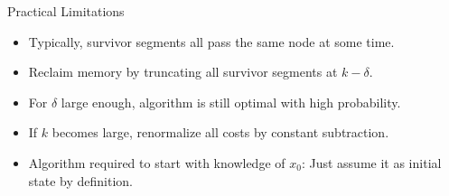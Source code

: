 \documentclass[xetex,mathserif,serif]{beamer}
\begin{document}
\begin{frame}{Practical Limitations}
    \begin{itemize}
        \item Typically, survivor segments all pass the same node at some time.
        \item Reclaim memory by truncating all survivor segments at
              $k - \delta$.
        \item For $\delta$ large enough, algorithm is still optimal with high
              probability.
        \item If $k$ becomes large, renormalize all costs by constant
              subtraction.
        \item Algorithm required to start with knowledge of $x_0$: Just assume
              it as initial state by definition.
    \end{itemize}
\end{frame}
\end{document}
